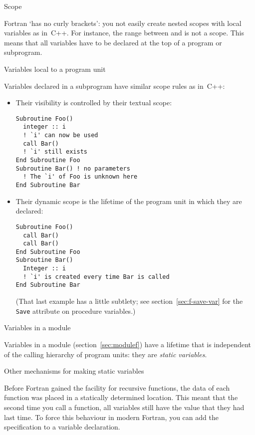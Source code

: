 
 {Scope}

Fortran `has no curly brackets': you not easily create nested
scopes with local variables as in~C++.
For instance, the range between  and  is not a scope.
This means that all variables have to be declared at the top of a
program or subprogram.

 {Variables local to a program unit}

Variables declared in a subprogram have similar scope rules as in~C++:
\begin{itemize}
\item Their visibility is controlled by their textual scope:
\begin{lstlisting}
Subroutine Foo()
  integer :: i
  ! `i' can now be used
  call Bar()
  ! `i' still exists
End Subroutine Foo
Subroutine Bar() ! no parameters
  ! The `i' of Foo is unknown here
End Subroutine Bar
\end{lstlisting}
\item Their dynamic scope is the lifetime of the program unit in which
  they are declared:
\begin{lstlisting}
Subroutine Foo()
  call Bar()
  call Bar()
End Subroutine Foo
Subroutine Bar()
  Integer :: i
  ! `i' is created every time Bar is called
End Subroutine Bar
\end{lstlisting}
(That last example has a little subtlety; see section~\ref{sec:f-save-var}
for the \lstinline{Save} attribute on procedure variables.)
\end{itemize}

 {Variables in a module}

Variables in a module (section~\ref{sec:modulef}) have a lifetime that
is independent of the calling hierarchy of program units: they are
\emph{static variables}.

 {Other mechanisms for making static variables}

Before Fortran gained the facility for recursive functions, the data
of each function was placed in a statically determined location. This
meant that the second time you call a function, all variables still
have the value that they had last time. To force this behaviour
in modern Fortran, you can add the  specification
to a variable declaration.

